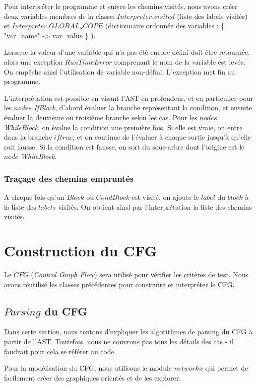 \documentclass[a4paper]{article}
\begin{document}
Pour interpréter le programme et suivre les chemins visités, nous avons créer deux variables membres de la classe: $Interpreter.visited$ (liste des labels visités) et $Interpreter.GLOBAL_SCOPE$ (dictionnaire ordonnée des variables : \{ "var\_name" -> var\_value \} ). 

Lorsque la valeur d'une variable qui n'a pas été encore défini doit être retournée, alors une exception $RunTimeError$ comprenant le nom de la variable est levée. On empêche ainsi l'utilisation de variable non-défini. L'exception met fin au programme. 

L'interprétation est possible en visant l'AST en profondeur, et en particulier pour les $nodes$ \textit{IfBlock}, d'abord évaluer la branche représentant la condition, et ensuite évaluer la deuxième ou troisième branche selon les cas. Pour les $nodes$ \textit{WhileBlock}, on évalue la condition une première fois. Si elle est vraie, on entre dans la branche $if true$, et on continue de l'évaluer à chaque sortie jusqu'à qu'elle soit fausse. Si la condition est fausse, on sort du sous-arbre dont l'origine est le $node$ \textit{WhileBlock}. 

\subsubsection{Traçage des chemins empruntés}

A chaque fois qu'un $Block$ ou $CondBlock$ est visité, on ajoute le $label$ du $block$ à la liste des $labels$ visités. On obtient ainsi par l'interprétation la liste des chemins visités. 

\section{Construction du CFG}

Le $CFG$ (\textit{Control Graph Flow}) sera utilisé pour vérifier les critères de test. Nous avons réutilisé les classes précédentes pour construire et interpréter le CFG.

\subsection{$Parsing$ du CFG}

Dans cette section, nous tentons d'expliquer les algorithmes de parsing du CFG à partir de l'AST. Toutefois, nous ne couvrons pas tous les détails des cas - il faudrait pour cela se référer au code.

Pour la modélisation du CFG, nous utilisons le module $networkx$ qui permet de facilement créer des graphiques orientés et de les explorer. 
\end{document}
